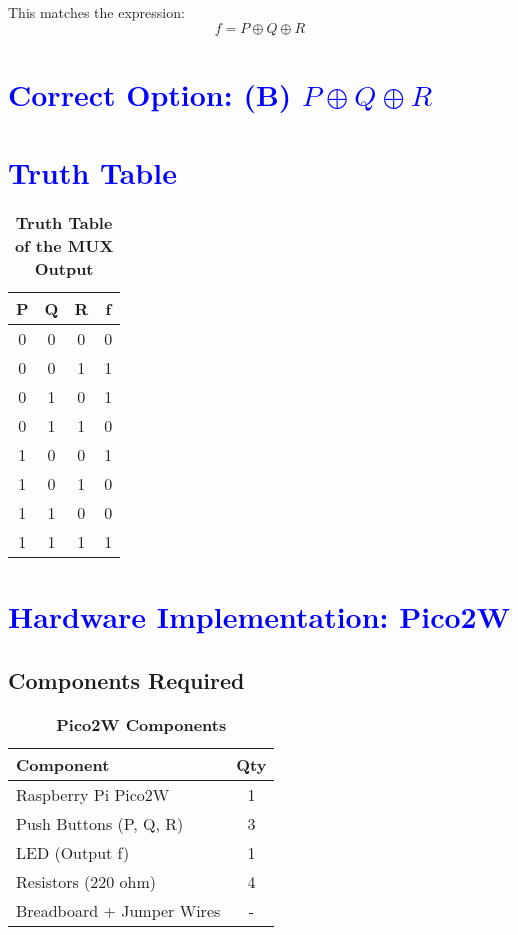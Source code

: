 \documentclass[twocolumn]{article}
\begin{document}
This matches the expression: \[ f = P \oplus Q \oplus R \]

\section*{\textcolor{blue}{Correct Option: (B) $P \oplus Q \oplus R$}}

\section*{\textcolor{blue}{Truth Table}}

\begin{table}[h]
\centering
\renewcommand{\arraystretch}{1.2}
\begin{tabular}{|c|c|c|c|}
\hline
P & Q & R & f \\
\hline
0 & 0 & 0 & 0 \\
0 & 0 & 1 & 1 \\
0 & 1 & 0 & 1 \\
0 & 1 & 1 & 0 \\
1 & 0 & 0 & 1 \\
1 & 0 & 1 & 0 \\
1 & 1 & 0 & 0 \\
1 & 1 & 1 & 1 \\
\hline
\end{tabular}
\caption*{\textbf{Truth Table of the MUX Output}}
\end{table}

\section*{\textcolor{blue}{Hardware Implementation: Pico2W}}

\subsection*{Components Required}
\begin{table}[h]
\centering
\renewcommand{\arraystretch}{1.2}
\begin{tabular}{|>{\raggedright}p{5cm}|c|}
\hline
\textbf{Component} & \textbf{Qty} \\
\hline
Raspberry Pi Pico2W & 1 \\
Push Buttons (P, Q, R) & 3 \\
LED (Output f) & 1 \\
Resistors (220 ohm) & 4 \\
Breadboard + Jumper Wires & - \\
\hline
\end{tabular}
\caption*{\textbf{Pico2W Components}}
\end{table}
\end{document}
